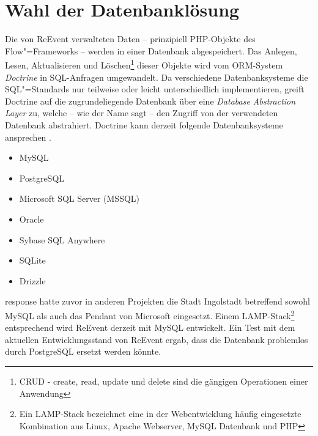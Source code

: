 \section{Wahl der Datenbanklösung}
\label{sec:reevent.database}

Die von ReEvent verwalteten Daten -- prinzipiell PHP-Objekte des Flow"=Frameworks -- werden in einer Datenbank abgespeichert. Das Anlegen, Lesen, Aktualisieren und Löschen\footnote{CRUD - create, read, update und delete sind die gängigen Operationen einer Anwendung} dieser Objekte wird vom ORM-System \emph{Doctrine} in SQL-Anfragen umgewandelt. Da verschiedene Datenbanksysteme die SQL"=Standards nur teilweise oder leicht unterschiedlich implementieren, greift Doctrine auf die zugrundeliegende Datenbank über eine \emph{Database Abstraction Layer} zu, welche -- wie der Name sagt -- den Zugriff von der verwendeten Datenbank abstrahiert. Doctrine kann derzeit folgende Datenbanksysteme ansprechen \cite{TheDoctrineProject.2015}.

\begin{multicols}{2}
\begin{itemize}
	\item MySQL
	\item PostgreSQL
	\item Microsoft SQL Server (MSSQL)
	\item Oracle
	\item Sybase SQL Anywhere
	\item SQLite
	\item Drizzle
\end{itemize}
\end{multicols}

response hatte zuvor in anderen Projekten die Stadt Ingolstadt betreffend sowohl MySQL als auch das Pendant von Microsoft eingesetzt. Einem LAMP-Stack\footnote{Ein LAMP-Stack bezeichnet eine in der Webentwicklung häufig eingesetzte Kombination aus Linux, Apache Webserver, MySQL Datenbank und PHP} entsprechend wird ReEvent derzeit mit MySQL entwickelt. Ein Test mit dem aktuellen Entwicklungsstand von ReEvent ergab, dass die Datenbank problemlos durch PostgreSQL ersetzt werden könnte.

